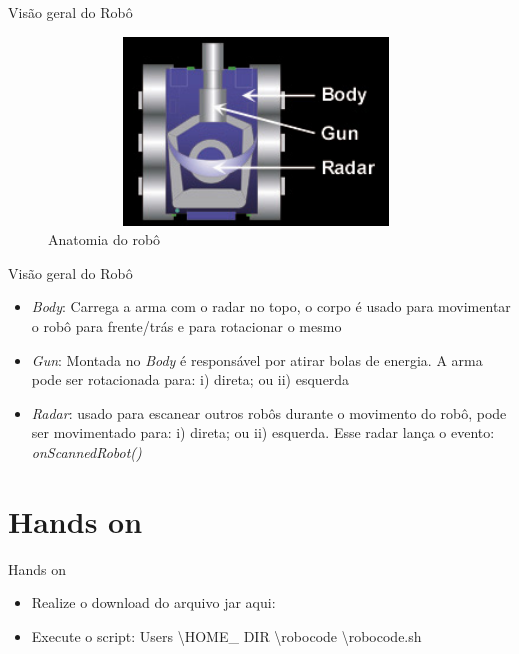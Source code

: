 \begin{frame}
	\begin{block}{Visão geral do Robô}
		\begin{figure}[!htb]
			\centering	  				
			\includegraphics[height=5cm, width = 11cm]{./pic/Anatomy.jpg}
			\caption{Anatomia do robô  \citep{ROBOWIKI}}
			\label{fig_instalacao04}
		\end{figure}
	\end{block}
\end{frame}


\begin{frame}
	\begin{block}{Visão geral do Robô}
		\begin{itemize}
			\item \emph{Body}: Carrega a arma com o radar no topo, o corpo é usado para movimentar o robô para frente/trás e para rotacionar o mesmo
			
			\item \emph{Gun}: Montada no \emph{Body} é responsável por atirar bolas de energia. A arma pode ser rotacionada para: i) direta; ou ii) esquerda

			\item \emph{Radar}: usado para escanear outros robôs durante o movimento do robô, pode ser movimentado para: i) direta; ou ii) esquerda. Esse radar lança o evento:  \emph{onScannedRobot()}  \citep{ROBOWIKI}
						
		\end{itemize}
	\end{block}
\end{frame}


\section{Hands on}

\begin{frame}
	\begin{block}{Hands on}
		\begin{itemize}
			\item Realize o download do arquivo jar aqui: \href{https://sourceforge.net/projects/robocode/files/robocode/1.9.3.4/}{\color{blue}{Source Forge}}  
			
			\item Execute o script:  Users \textbackslash  HOME\_ DIR \textbackslash  robocode \textbackslash robocode.sh
		\end{itemize}
	\end{block}
\end{frame}


